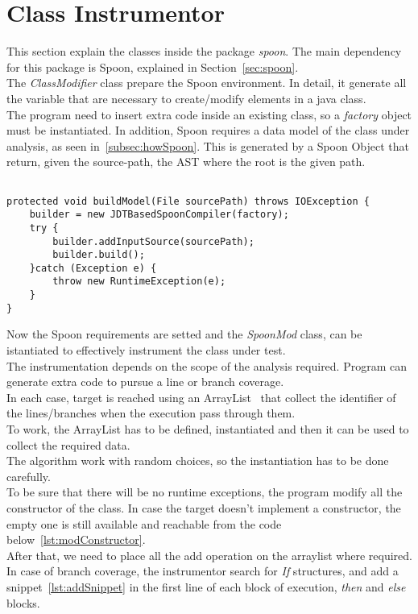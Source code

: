 \section{Class Instrumentor}\label{sec:ClassInstr}
This section explain the classes inside the package \emph{spoon}.
The main dependency for this package is Spoon, explained in Section~\ref{sec:spoon}.\\
The \emph{ClassModifier} class prepare the Spoon environment.
In detail, it generate all the variable that are necessary to create/modify elements in a java class.\\
The program need to insert extra code inside an existing class, so a \emph{factory} object must be instantiated.
In addition, Spoon requires a data model of the class under analysis, as seen in~\ref{subsec:howSpoon}.
This is generated by a Spoon Object that return, given the source-path, the AST where the root is the given path.
\begin{lstlisting}[caption={The function to create the AST from the ClassModifier class},label={lst:ASTmodel}]% Start your code-block

protected void buildModel(File sourcePath) throws IOException {
	builder = new JDTBasedSpoonCompiler(factory);		
	try {
		builder.addInputSource(sourcePath);
		builder.build();
	}catch (Exception e) {
		throw new RuntimeException(e);
	}		
}
\end{lstlisting}
Now the Spoon requirements are setted and the \emph{SpoonMod} class, can be istantiated to effectively instrument the class under test.\\
The instrumentation depends on the scope of the analysis required.
Program can generate extra code to pursue a line or branch coverage.\\
In each case, target is reached using an ArrayList~\cite{ArrayList} that collect the identifier of the lines/branches when the execution pass through them.\\
To work, the ArrayList has to be defined, instantiated and then it can be used to collect the required data.\\
The algorithm work with random choices, so the instantiation has to be done carefully.\\
To be sure that there will be no runtime exceptions, the program modify all the constructor of the class.
In case the target doesn't implement a constructor, the empty one is still available and reachable from the code below~\ref{lst:modConstructor}.\\
After that, we need to place all the add operation on the arraylist where required.
In case of branch coverage, the instrumentor search for \emph{If} structures, and add a snippet~\ref{lst:addSnippet} in the first line of each block of execution, \emph{then} and \emph{else} blocks.\\

